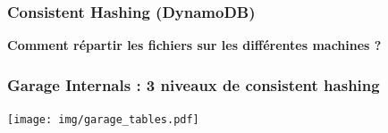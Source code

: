 \documentclass[aspectratio=169]{beamer}
\begin{document}
\begin{frame}
	\frametitle{Consistent Hashing (DynamoDB)}
	\textbf{Comment répartir les fichiers sur les différentes machines ?}
	\vspace{1em}

	\centering

\end{frame}

\begin{frame}
	\frametitle{Garage Internals : 3 niveaux de consistent hashing}
	\centering
	\texttt{[image: img/garage\_tables.pdf]}
\end{frame}
\end{document}
